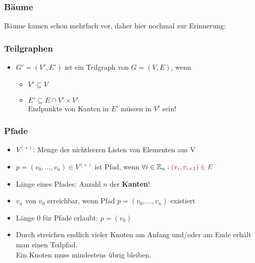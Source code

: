 \documentclass{article}
\newcommand{\Z}{\mathbb{Z}} %
\newcommand{\blue}[1]{\textcolor{blue}{#1}}
\newcommand{\strongColor}[1]{\textcolor{strongColor}{#1}}
\newcommand{\strong}[1]{\textbf{\strongColor{#1}}}
\newcommand{\important}[1]{\textcolor{importantColor}{#1}}
\newcommand{\word}[1]{\blue{\texttt{#1}}}
\begin{document}
\subsubsection{Bäume}
Bäume kamen schon mehrfach vor, daher hier nochmal zur Erinnerung:\\

\subsubsection{Teilgraphen}
\begin{itemize}
    \item $G'=(V',E')$ ist ein Teilgraph von $G=(V,E)$, wenn 
    \begin{itemize}
        \item $V'\subseteq V$
        \item $E' \subseteq E\cap V'\times V'$\\
        \important{Endpunkte von Kanten in $E'$ müssen in $V'$ sein!}
    \end{itemize}
\end{itemize}

\subsubsection{Pfade}
\begin{itemize}
    \item \important{$V^{(+)}$}: Menge der nichtleeren Listen von Elementen aus V
    \item \important{$p=(v_0,\dots, v_n)\in V^{(+)}$} ist \important{Pfad}, wenn $\forall i \in \Z_n: \important{(v_i,v_{i+1}) \in E}$
    \item \important{Länge eines Pfades}: Anzahl $n$ der \strong{Kanten}!
    \item $v_n$ von $v_0$ \important{erreichbar}, wenn Pfad $p=(v_0,\dots, v_n)$ existiert
    \item Länge 0 für Pfade erlaubt: $p=(v_0)$
    \item Durch streichen endlich vieler Knoten am Anfang und/oder am Ende erhält man einen Teilpfad.\\Ein Knoten muss mindestens übrig bleiben.
\end{itemize}
\end{document}
